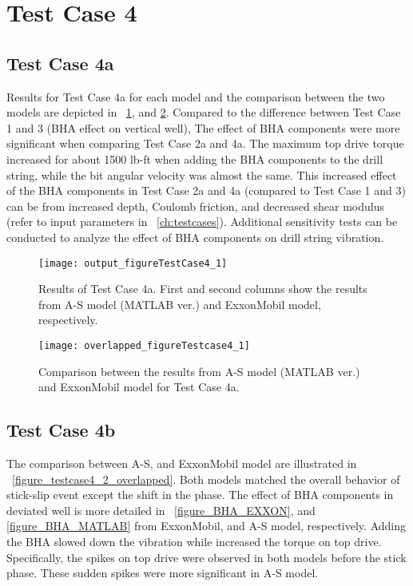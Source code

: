 \section{Test Case 4}
\subsection{Test Case 4a}
Results for Test Case 4a for each model and the comparison between the two models are depicted in \figurename~\ref{figure_testcase4_1}, and \ref{figure_testCase4_1_overlapped}. Compared to the difference between Test Case 1 and 3 (BHA effect on vertical well), The effect of BHA components were more significant when comparing Test Case 2a and 4a. The maximum top drive torque increased for about 1500 lb-ft when adding the BHA components to the drill string, while the bit angular velocity was almost the same. This increased effect of the BHA components in Test Case 2a and 4a (compared to Test Case 1 and 3) can be from increased depth, Coulomb friction, and decreased shear modulus (refer to input parameters in \chaptername~\ref{ch:testcases}). Additional sensitivity tests can be conducted to analyze the effect of BHA components on drill string vibration. 

\begin{figure}
  \centering
  \texttt{[image: output\_figureTestCase4\_1]}
  \caption[Results of Test Case 4a]{Results of Test Case 4a. First and second columns show the results from A-S model (MATLAB ver.) and ExxonMobil model, respectively.}\label{figure_testcase4_1}
\end{figure}

\begin{figure}
  \centering
  \texttt{[image: overlapped\_figureTestcase4\_1]}
  \caption[Comparison of the results for Test Case 4a]{Comparison between the results from A-S model (MATLAB ver.) and ExxonMobil model for Test Case 4a.}\label{figure_testCase4_1_overlapped}
\end{figure}


\subsection{Test Case 4b}
The comparison between A-S, and ExxonMobil model are illustrated in \figurename~\ref{figure_testcase4_2_overlapped}. Both models matched the overall behavior of stick-slip event except the shift in the phase. The effect of BHA components in deviated well is more detailed in \figurename~\ref{figure_BHA_EXXON}, and \ref{figure_BHA_MATLAB} from ExxonMobil, and A-S model, respectively. Adding the BHA slowed down the vibration while increased the torque on top drive. Specifically, the spikes on top drive were observed in both models before the stick phase. These sudden spikes were more significant in A-S model.


